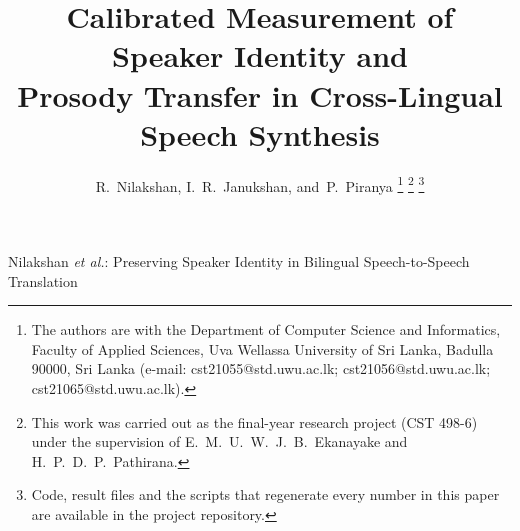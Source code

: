 \documentclass[journal]{IEEEtran}
\begin{document}
\title{Calibrated Measurement of Speaker Identity and\\
Prosody Transfer in Cross-Lingual Speech Synthesis}

\author{R.~Nilakshan,
        I.~R.~Janukshan,
        and~P.~Piranya%
\thanks{The authors are with the Department of Computer Science and Informatics,
Faculty of Applied Sciences, Uva Wellassa University of Sri Lanka, Badulla 90000, Sri Lanka
(e-mail: cst21055@std.uwu.ac.lk; cst21056@std.uwu.ac.lk; cst21065@std.uwu.ac.lk).}%
\thanks{This work was carried out as the final-year research project (CST 498-6)
under the supervision of E.~M.~U.~W.~J.~B.~Ekanayake and H.~P.~D.~P.~Pathirana.}%
\thanks{Code, result files and the scripts that regenerate every number in this paper are
available in the project repository.}}


%
{Nilakshan \MakeLowercase{\textit{et al.}}: Preserving Speaker Identity in Bilingual
Speech-to-Speech Translation}

\maketitle
\end{document}
